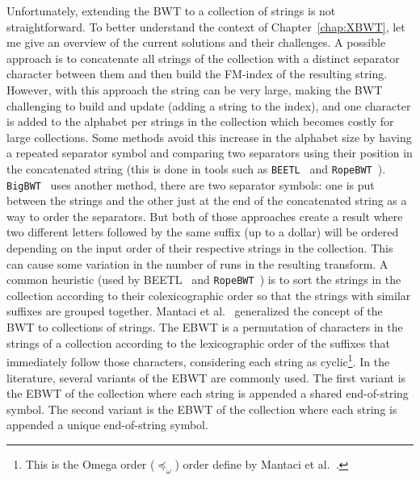 Unfortunately, extending the BWT to a collection of strings is not straightforward. To better understand the context of Chapter~\ref{chap:XBWT}, let me give an overview of the current solutions and their challenges. A possible approach is to concatenate all strings of the collection with a distinct separator character between them and then build the FM-index of the resulting string. However, with this approach the string can be very large, making the BWT challenging to build and update (adding a string to the index), and one character is added to the alphabet per strings in the collection which becomes costly for large collections. Some methods avoid this increase in the alphabet size by having a repeated separator symbol and comparing two separators using their position in the concatenated string (this is done in tools such as \texttt{BEETL}~\cite{Beetl} and \texttt{RopeBWT}~\cite{ropebwt2}). \texttt{BigBWT}~\cite{boucher2019prefix} uses another method, there are two separator symbols: one is put between the strings and the other just at the end of the concatenated string as a way to order the separators. But both of those approaches create a result where two different letters followed by the same suffix (up to a dollar) will be ordered depending on the input order of their respective strings in the collection. This can cause some variation in the number of runs in the resulting transform. A common heuristic (used by {BEETL}~\cite{Beetl} and \texttt{RopeBWT}~\cite{ropebwt2}) is to sort the strings in the collection according to their colexicographic order so that the strings with similar suffixes are grouped together.
Mantaci et al.~\cite{mantaci2007extension} generalized the concept of the BWT to collections of strings. The EBWT is a permutation of characters in the strings of a collection according to the lexicographic order of the suffixes that immediately follow those characters, considering each string as cyclic\footnote{This is the Omega order ($\preccurlyeq_\omega$) order define by Mantaci et al.~\cite{mantaci2007extension}.}.
In the literature, several variants of the EBWT are commonly used. The first variant is the EBWT of the collection where each string is appended a shared end-of-string symbol. The second variant is the EBWT of the collection where each string is appended a unique end-of-string symbol. 

